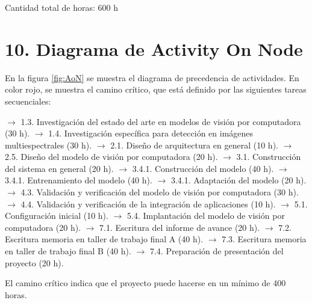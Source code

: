 \documentclass[
11pt, %
]{charter}
\begin{document}
Cantidad total de horas: 600 h

\section{10. Diagrama de Activity On Node}
\label{sec:AoN}

En la figura \ref{fig:AoN} se muestra el diagrama de precedencia de actividades. En color rojo, se muestra el camino crítico, que está definido por las siguientes tareas secuenciales:

$\rightarrow$ 1.3. Investigación del estado del arte en modelos de visión por computadora (30 h). \newline
$\rightarrow$ 1.4. Investigación específica para detección en imágenes multiespectrales (30 h). \newline
$\rightarrow$ 2.1. Diseño de arquitectura en general (10 h). \newline
$\rightarrow$ 2.5. Diseño del modelo de visión por computadora (20 h). \newline
$\rightarrow$ 3.1. Construcción del sistema en general (20 h). \newline
$\rightarrow$ 3.4.1. Construcción del modelo (40 h). \newline
$\rightarrow$ 3.4.1. Entrenamiento del modelo (40 h). \newline
$\rightarrow$ 3.4.1. Adaptación del modelo (20 h). \newline
$\rightarrow$ 4.3. Validación y verificación del modelo de visión por computadora (30 h). \newline
$\rightarrow$ 4.4. Validación y verificación de la integración de aplicaciones (10 h). \newline
$\rightarrow$ 5.1. Configuración inicial (10 h). \newline
$\rightarrow$ 5.4. Implantación del modelo de visión por computadora (20 h). \newline
$\rightarrow$ 7.1. Escritura del informe de avance (20 h). \newline
$\rightarrow$ 7.2. Escritura memoria en taller de trabajo final A (40 h). \newline
$\rightarrow$ 7.3. Escritura memoria en taller de trabajo final B (40 h). \newline
$\rightarrow$ 7.4. Preparación de presentación del proyecto (20 h). \newline


El camino crítico indica que el proyecto puede hacerse en un mínimo de 400 horas.
\end{document}
